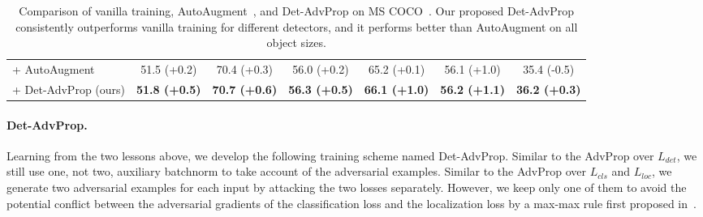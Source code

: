 \documentclass[final]{cvpr}
\begin{document}
\begin{table*}[!htb]
{\begin{tabular}{l|c|c|c|c|c|c}
+ AutoAugment & 51.5 (+0.2) & 70.4 (+0.3) & 56.0 (+0.2) & 65.2 (+0.1) & 56.1 (+1.0) & 35.4 (-0.5) \\
+ Det-AdvProp (ours) & \textbf{51.8 (+0.5)} & \textbf{70.7 (+0.6)} & \textbf{56.3 (+0.5)} & \textbf{66.1 (+1.0)} & \textbf{56.2 (+1.1)} & \textbf{36.2 (+0.3)} \\ \hline
\end{tabular}}
\smallskip
\caption{Comparison of vanilla training, AutoAugment~\cite{zoph2019learning}, and Det-AdvProp on MS COCO~\cite{lin2015coco}. Our proposed Det-AdvProp consistently outperforms vanilla training  for different detectors, and it performs better than AutoAugment on all object sizes.}
\label{tab:main}
\vspace{-10pt}
\end{table*}


\vspace{-10pt}
\paragraph{Det-AdvProp.}
Learning from the two lessons above, we develop the following training scheme named Det-AdvProp. Similar to the AdvProp over $L_{det}$,  we still use one, not two, auxiliary batchnorm to take account of the adversarial examples. Similar to the AdvProp over  $L_{cls}$ and $L_{loc}$, we generate two adversarial examples for each input by attacking the two losses separately. However, we keep only one of them to avoid the potential conflict between the adversarial gradients of the classification loss and the localization loss by a max-max rule first proposed in~\cite{zhang2019towards}.
\end{document}
